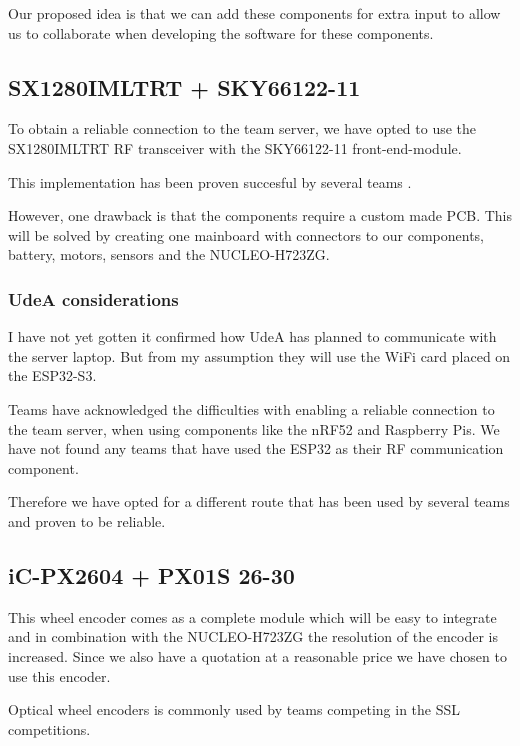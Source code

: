 \documentclass[a4paper,8pt]{article}
\begin{document}
  Our proposed idea is that we can add these components for extra input to allow us to collaborate when developing the software for these components. 

  \subsection{SX1280IMLTRT + SKY66122-11}

  To obtain a reliable connection to the team server, we have opted to
  use the SX1280IMLTRT RF transceiver with the SKY66122-11
  front-end-module.

  This implementation has been proven succesful by several teams \cite{ryllExtendedTeamDescription}\cite{barretoRoboIMEIgnitingInnovation}.

  However, one drawback is that the components require a custom made
  PCB. This will be solved by creating one mainboard with connectors to
  our components, battery, motors, sensors and the NUCLEO-H723ZG. 

  \subsubsection{UdeA considerations}

  I have not yet gotten it confirmed how UdeA has planned to communicate with the server laptop. But from my assumption they will use the WiFi card placed on the ESP32-S3. 

  Teams have acknowledged the difficulties with enabling a reliable connection to the team server, when using components like the nRF52 and Raspberry Pis. We have not found any teams that have used the ESP32 as their RF communication component.

  Therefore we have opted for a different route that has been used by several teams and proven to be reliable\cite{ryllExtendedTeamDescription}.

  \subsection{iC-PX2604 + PX01S 26-30}

  This wheel encoder comes as a complete module which will be easy to
  integrate and in combination with the NUCLEO-H723ZG the resolution of
  the encoder is increased. Since we also have a quotation at a
  reasonable price we have chosen to use this encoder.

  Optical wheel encoders is commonly used by teams competing in the SSL competitions.
\end{document}
